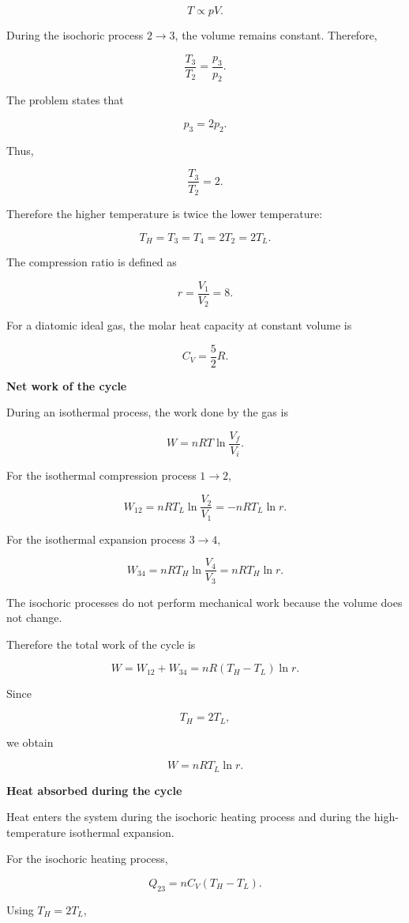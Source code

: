 \documentclass[letterpaper,12pt]{letter}
\begin{document}
\begin{enumerate}[label=\Roman*.]
\begin{enumerate}[label=\arabic*.]
$$T\propto pV.$$

During the isochoric process $2\rightarrow3$, the volume remains constant. Therefore,

$$\frac{T_3}{T_2}=\frac{p_3}{p_2}.$$

The problem states that

$$p_3=2p_2.$$

Thus,

$$\frac{T_3}{T_2}=2.$$

Therefore the higher temperature is twice the lower temperature:

$$T_H=T_3=T_4=2T_2=2T_L.$$

The compression ratio is defined as

$$r=\frac{V_1}{V_2}=8.$$

For a diatomic ideal gas, the molar heat capacity at constant volume is

$$C_V=\frac{5}{2}R.$$

\bigskip

\textbf{Net work of the cycle}

During an isothermal process, the work done by the gas is

$$W=nRT\ln\frac{V_f}{V_i}.$$

For the isothermal compression process $1\rightarrow2$,

$$W_{12}=nRT_L\ln\frac{V_2}{V_1}=-nRT_L\ln r.$$

For the isothermal expansion process $3\rightarrow4$,

$$W_{34}=nRT_H\ln\frac{V_4}{V_3}=nRT_H\ln r.$$

The isochoric processes do not perform mechanical work because the volume does not change.

Therefore the total work of the cycle is

$$W=W_{12}+W_{34}=nR(T_H-T_L)\ln r.$$

Since

$$T_H=2T_L,$$

we obtain

$$W=nRT_L\ln r.$$

\bigskip

\pagebreak
\textbf{Heat absorbed during the cycle}

Heat enters the system during the isochoric heating process and during the high-temperature isothermal expansion.

For the isochoric heating process,

$$Q_{23}=nC_V(T_H-T_L).$$

Using $T_H=2T_L$,


\end{enumerate}
\end{enumerate}
\end{document}
